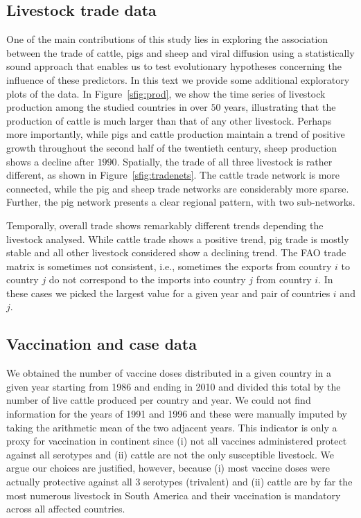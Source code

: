 \documentclass[a4paper,10pt]{article}
\begin{document}
\subsection*{Livestock trade data}

One of the main contributions of this study lies in exploring the association between the trade of cattle, pigs and sheep and viral diffusion using a statistically sound approach that enables us to test evolutionary hypotheses concerning the influence of these predictors.
In this text we provide some additional exploratory plots of the data.
In Figure~\ref{sfig:prod}, we show the time series of livestock production among the studied countries in over $50$ years, illustrating that the production of cattle is much larger than that of any other livestock.
Perhaps more importantly, while pigs and cattle production maintain a trend of positive growth throughout the second half of the twentieth century, sheep production shows a decline after $1990$.
Spatially, the trade of all three livestock is rather different, as shown in Figure~\ref{sfig:tradenets}.
The cattle trade network is more connected, while the pig and sheep trade networks are considerably more sparse.
Further, the pig network presents a clear regional pattern, with two sub-networks.

Temporally, overall trade shows remarkably different trends depending the livestock analysed.
While cattle trade shows a positive trend, pig trade is mostly  stable and all other livestock considered show a declining trend.
The FAO trade matrix is sometimes not consistent, i.e., sometimes the exports from country $i$ to country $j$ do not correspond to the imports into country $j$ from country $i$.
In these cases we picked the largest value for a given year and pair of countries $i$ and $j$.

\subsection*{Vaccination and case data}

We obtained the number of vaccine doses distributed in a given country in a given year starting from 1986 and ending in 2010 and divided this total by the number of live cattle produced per country and year.
We could not find information for the years of 1991 and 1996 and these were manually imputed by taking the arithmetic mean of the two adjacent years.
This indicator is only a proxy for vaccination in continent since (i) not all vaccines administered protect against all serotypes and (ii) cattle are not the only susceptible livestock.
We argue our choices are justified, however, because (i) most vaccine doses were actually protective against all 3 serotypes (trivalent) and (ii) cattle are by far the most numerous livestock in South America and their vaccination is mandatory across all affected countries.
\end{document}
